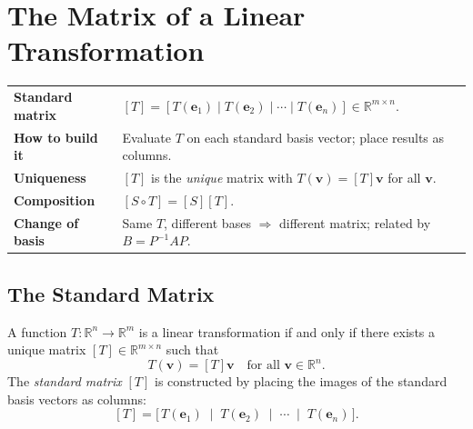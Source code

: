 
\section{The Matrix of a Linear Transformation}

\begin{tcolorbox}[colback=gray!6, colframe=gray!40, arc=2pt,
  left=6pt, right=6pt, top=4pt, bottom=4pt,
  title={\small\textbf{Standard Matrix --- Quick Reference}},
  fonttitle=\small\bfseries]
\begin{tabular}{@{}p{}p{}@{}}
\textbf{Standard matrix}      & $[T] = [T(\mathbf{e}_1)\mid T(\mathbf{e}_2)\mid\cdots\mid T(\mathbf{e}_n)] \in \mathbb{R}^{m\times n}$. \\[4pt]
\textbf{How to build it}       & Evaluate $T$ on each standard basis vector; place results as columns. \\[4pt]
\textbf{Uniqueness}            & $[T]$ is the \emph{unique} matrix with $T(\mathbf{v}) = [T]\mathbf{v}$ for all $\mathbf{v}$. \\[4pt]
\textbf{Composition}           & $[S \circ T] = [S][T]$. \\[4pt]
\textbf{Change of basis}       & Same $T$, different bases $\Rightarrow$ different matrix; related by $B = P^{-1}AP$. \\
\end{tabular}
\end{tcolorbox}

\subsection{The Standard Matrix}

\begin{tcolorbox}[colback=thmbox, colframe=thmborder, arc=2pt,
  left=6pt, right=6pt, top=4pt, bottom=4pt,
  title={\small\textbf{Theorem (Standard Matrix of a Linear Transformation)}},
  fonttitle=\small\bfseries]
A function $T : \mathbb{R}^n \to \mathbb{R}^m$ is a linear transformation if and only if
there exists a unique matrix $[T] \in \mathbb{R}^{m \times n}$ such that
\[
  T(\mathbf{v}) = [T]\mathbf{v} \quad \text{for all } \mathbf{v} \in \mathbb{R}^n.
\]
The \emph{standard matrix} $[T]$ is constructed by placing the images of
the standard basis vectors as columns:
\[
  [T] = \bigl[\, T(\mathbf{e}_1) \;\mid\; T(\mathbf{e}_2) \;\mid\; \cdots \;\mid\; T(\mathbf{e}_n) \,\bigr].
\]
\end{tcolorbox}

